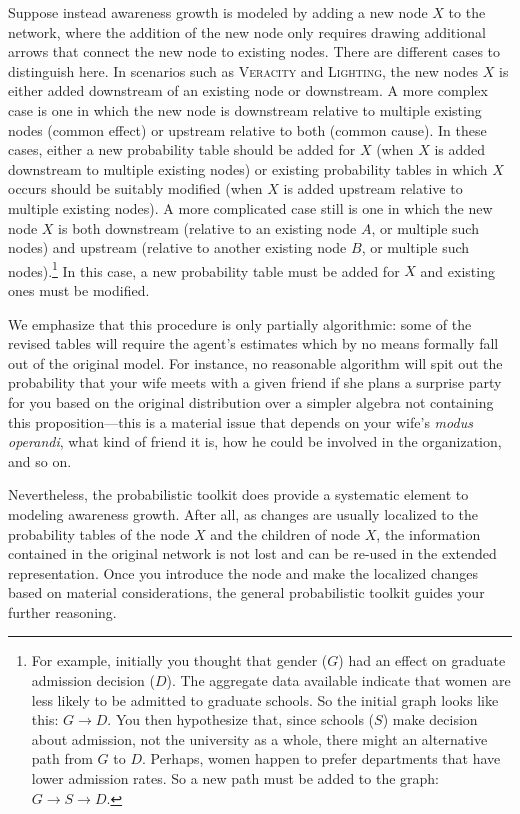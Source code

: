 \documentclass[
  11pt,
  dvipsnames,enabledeprecatedfontcommands, todos]{scrartcl}
\begin{document}
Suppose instead awareness growth is modeled by adding a new node \(X\)
to the network, where the addition of the new node only requires drawing
additional arrows that connect the new node to existing nodes. There are
different cases to distinguish here. In scenarios such as
\textsc{Veracity} and \textsc{Lighting}, the new nodes \(X\) is either
added downstream of an existing node or downstream. A more complex case
is one in which the new node is downstream relative to multiple existing
nodes (common effect) or upstream relative to both (common cause). In
these cases, either a new probability table should be added for \(X\)
(when \(X\) is added downstream to multiple existing nodes) or existing
probability tables in which \(X\) occurs should be suitably modified
(when \(X\) is added upstream relative to multiple existing nodes). A
more complicated case still is one in which the new node \(X\) is both
downstream (relative to an existing node \(A\), or multiple such nodes)
and upstream (relative to another existing node \(B\), or multiple such
nodes).\footnote{For example, initially you thought that gender (\(G\))
  had an effect on graduate admission decision (\(D\)). The aggregate
  data available indicate that women are less likely to be admitted to
  graduate schools. So the initial graph looks like this:
  \(G \rightarrow D\). You then hypothesize that, since schools (\(S\))
  make decision about admission, not the university as a whole, there
  might an alternative path from \(G\) to \(D\). Perhaps, women happen
  to prefer departments that have lower admission rates. So a new path
  must be added to the graph: \(G \rightarrow S \rightarrow D\).} In
this case, a new probability table must be added for \(X\) and existing
ones must be modified.


We emphasize that this procedure is only partially algorithmic: some of
the revised tables will require the agent's estimates which by no means
formally fall out of the original model. For instance, no reasonable
algorithm will spit out the probability that your wife meets with a
given friend if she plans a surprise party for you based on the original
distribution over a simpler algebra not containing this
proposition---this is a material issue that depends on your wife's
\emph{modus operandi}, what kind of friend it is, how he could be
involved in the organization, and so on.

Nevertheless, the probabilistic toolkit does provide a systematic
element to modeling awareness growth. After all, as changes are usually
localized to the probability tables of the node \(X\) and the children
of node \(X\), the information contained in the original network is not
lost and can be re-used in the extended representation. Once you
introduce the node and make the localized changes based on material
considerations, the general probabilistic toolkit guides your further
reasoning.
\end{document}
